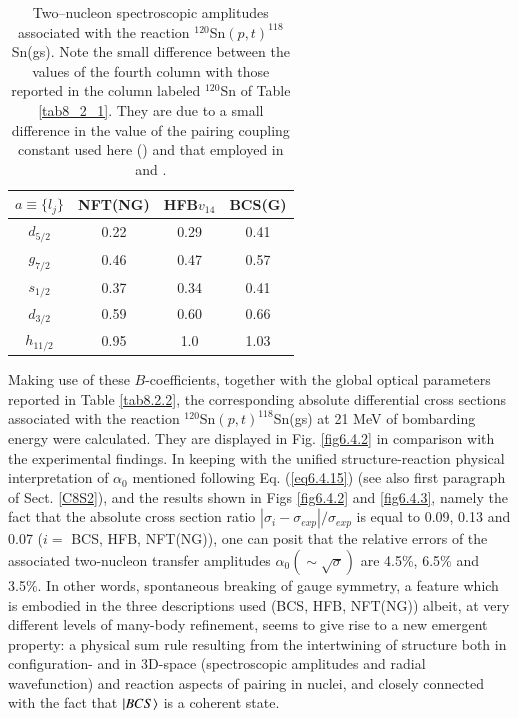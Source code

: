 \begin{table}
\begin{center}
\begin{tabular}{|c|c|c|c|}
\hline
$a\equiv\{l_j\}$ & NFT(NG)  & HFB$v_{14}$  & BCS(G)  \\ 
 \hline 
$d_{5/2}$ & 0.22 & 0.29 & 0.41 \\ 
\hline 
$g_{7/2}$ & 0.46 & 0.47 &  0.57\\ 
 \hline
$s_{1/2}$ & 0.37 & 0.34 & 0.41 \\ 
 \hline
$d_{3/2}$ & 0.59 & 0.60 & 0.66 \\ 
 \hline
$h_{11/2}$ & 0.95 & 1.0 & 1.03\\
 \hline
\end{tabular}
\end{center}
\caption{Two--nucleon spectroscopic amplitudes associated with the reaction $^{120}$Sn$(p,t)^{118}$Sn(gs). Note the small difference between the values of the fourth column with those reported in the column labeled $^{120}$Sn of Table \ref{tab8_2_1}. They are due to a small difference in the value of the pairing coupling constant used here  (\cite{Potel:17}) and that employed in \cite{Potel:17} and \cite{Potel:13b}.}\label{tab6.4.3}
\end{table} 

Making use of these $B$-coefficients, together with the global optical parameters reported in Table \ref{tab8.2.2}, the corresponding absolute differential cross sections associated with the reaction $^{120}$Sn$(p,t)^{118}$Sn(gs) at 21 MeV of bombarding energy were calculated. They are displayed in Fig. \ref{fig6.4.2} in comparison with the experimental findings. In keeping with the unified structure-reaction physical interpretation of $\alpha_0$ mentioned following Eq. (\ref{eq6.4.15}) (see also first paragraph of Sect. \ref{C8S2}), and 
the results shown in Figs \ref{fig6.4.2} and \ref{fig6.4.3}, namely the fact that the absolute cross section ratio $|\sigma_i-\sigma_{exp}|/\sigma_{exp}$ is equal to 0.09, 0.13 and 0.07 ($i=$ BCS, HFB, NFT(NG)), one can posit that the relative errors of the associated two-nucleon transfer amplitudes $\alpha_0(\sim\sqrt{\sigma})$ are 4.5\%, 6.5\% and 3.5\%. In other words, spontaneous breaking of gauge symmetry, a feature which is embodied in the three descriptions used (BCS, HFB, NFT(NG)) albeit, at very different levels of many-body refinement, seems to give rise to a new emergent property: a physical sum rule resulting from the intertwining of structure both in configuration- and in 3D-space (spectroscopic amplitudes and radial wavefunction) and reaction aspects of pairing in nuclei, and closely connected with the fact that $|{BCS} \rangle$ is a coherent state. 

